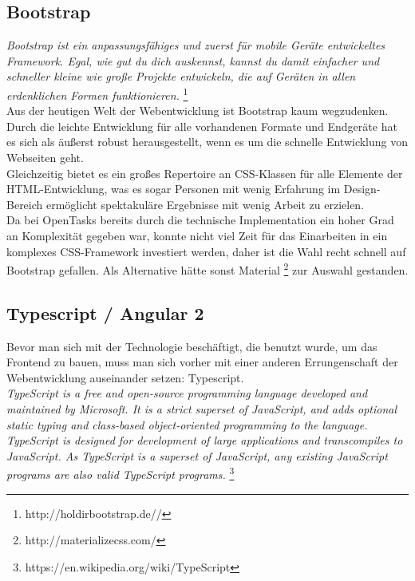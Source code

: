 \subsection{Bootstrap}

\emph{\glqq   
Bootstrap ist ein anpassungsfähiges und zuerst für mobile Geräte entwickeltes Framework. Egal, wie gut du dich auskennst, kannst du damit einfacher und schneller kleine wie große Projekte entwickeln, die auf Geräten in allen erdenklichen Formen funktionieren.
\grqq} \footnote{http://holdirbootstrap.de//} \\

Aus der heutigen Welt der Webentwicklung ist Bootstrap kaum wegzudenken. Durch die leichte Entwicklung für alle vorhandenen Formate und Endgeräte hat es sich als äußerst robust herausgestellt, wenn es um die schnelle Entwicklung von Webseiten geht. \\
Gleichzeitig bietet es ein großes Repertoire an CSS-Klassen für alle Elemente der HTML-Entwicklung, was es sogar Personen mit wenig Erfahrung im Design-Bereich ermöglicht spektakuläre Ergebnisse mit wenig Arbeit zu erzielen. \\

Da bei OpenTasks bereits durch die technische Implementation ein hoher Grad an Komplexität gegeben war, konnte nicht viel Zeit für das Einarbeiten in ein komplexes CSS-Framework investiert werden, daher ist die Wahl recht schnell auf Bootstrap gefallen. Als Alternative hätte sonst Material \footnote{http://materializecss.com/} zur Auswahl gestanden. \\



\subsection{Typescript / Angular 2} \label{TS_NG2}

Bevor man sich mit der Technologie beschäftigt, die benutzt wurde, um das Frontend zu bauen, muss man sich vorher mit einer anderen Errungenschaft der Webentwicklung auseinander setzen: Typescript. \\

\emph{\glqq   
TypeScript is a free and open-source programming language developed and maintained by Microsoft. It is a strict superset of JavaScript, and adds optional static typing and class-based object-oriented programming to the language. \\
TypeScript is designed for development of large applications and transcompiles to JavaScript. As TypeScript is a superset of JavaScript, any existing JavaScript programs are also valid TypeScript programs.
\grqq} \footnote{https://en.wikipedia.org/wiki/TypeScript} \\

